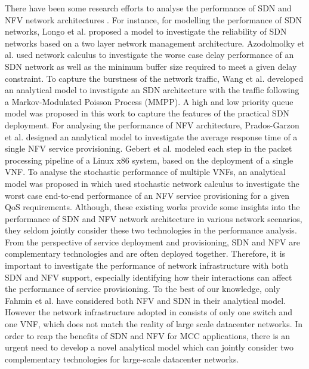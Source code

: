 There have been some research efforts to analyse the performance of SDN and NFV network architectures \cite{LongoDBS15} \cite{MiaoMWWH16} \cite{Prados-GarzonAR17} \cite{GebertZLST16} \cite{MiaoMWHZWL19}. For instance, for modelling the performance of SDN networks, Longo et al. \cite{LongoDBS15} proposed a model to investigate the reliability of SDN networks based on a two layer network management architecture. Azodolmolky et al. \cite{AzodolmolkyWY13} used network calculus to investigate the  worse case delay performance of an SDN network as well as the minimum buffer size required to meet a given delay constraint. To capture the burstness of the network traffic, Wang et al. \cite{MiaoMWWH16} developed an analytical model to investigate an SDN architecture with the traffic following a Markov-Modulated Poisson Process (MMPP). A high and low priority queue model was proposed in this work to capture the features of the practical SDN deployment. For analysing the performance of NFV architecture, Prados-Garzon et al. \cite{Prados-GarzonAR17} designed an analytical model to investigate the average response time of a single NFV service provisioning. Gebert et al. \cite{GebertZLST16} modeled each step in the packet processing pipeline of a Linux x86 system, based on the deployment of a single VNF. To analyse the stochastic performance of multiple VNFs, an analytical model was proposed in \cite{MiaoMWHZWL19} which used stochastic network calculus to investigate the worst case end-to-end performance of an NFV service provisioning for a given QoS requirements. Although, these existing works provide some insights into the performance of SDN and NFV network architecture in various network scenarios, they seldom jointly consider these two technologies in the performance analysis. From the perspective of service deployment and provisioning, SDN and NFV are complementary technologies and are often deployed together. Therefore, it is important to investigate the performance of network infrastructure with both SDN and NFV support, especially identifying how their interactions can affect the performance of service provisioning. To the best of our knowledge, only Fahmin et al. \cite{FahminLHLS17} have considered both NFV and SDN in their analytical model. However the network infrastructure adopted in \cite{FahminLHLS17} consists of only one switch and one VNF, which does not match the reality of large scale datacenter networks. In order to reap the benefits of SDN and NFV for MCC applications, there is an urgent need to develop a novel analytical model which can jointly consider two complementary technologies for large-scale datacenter networks.
 
